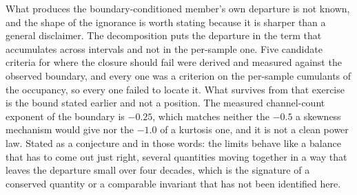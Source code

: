 What produces the boundary-conditioned member's own departure is not known, and the shape of the
ignorance is worth stating because it is sharper than a general disclaimer. The decomposition puts the
departure in the term that accumulates across intervals and not in the per-sample one. Five candidate
criteria for where the closure should fail were derived and measured against the observed boundary,
and every one was a criterion on the per-sample cumulants of the occupancy, so every one failed to
locate it. What survives from that exercise is the bound stated earlier and not a position. The measured
channel-count exponent of the boundary is $-0.25$, which matches neither the $-0.5$ a skewness
mechanism would give nor the $-1.0$ of a kurtosis one, and it is not a clean power law. %
Stated as a conjecture and in those words: the limits behave like a balance that has to come out just
right, several quantities moving together in a way that leaves the departure small over four decades,
which is the signature of a conserved quantity or a comparable invariant that has not been identified
here.

